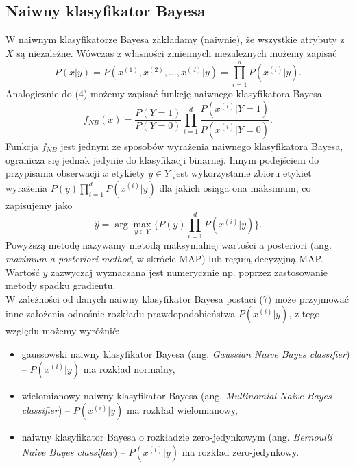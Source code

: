\documentclass[a4paper]{article}
\begin{document}
\subsection{Naiwny klasyfikator Bayesa}
W naiwnym klasyfikatorze Bayesa zakładamy (naiwnie), że wszystkie atrybuty z $X$ są niezależne. Wówczas z własności zmiennych niezależnych możemy zapisać
\begin{equation}
    P(x|y) = P(x^{(1)},x^{(2)},\dots, x^{(d)}|y) =  \prod\limits_{i=1}^d{P(x^{(i)}|y)}.
\end{equation}
Analogicznie do (4) możemy zapisać funkcję naiwnego klasyfikatora Bayesa 
\begin{equation}
    f_{NB}(x) = \frac{P(Y=1)}{P(Y=0)}\prod\limits_{i=1}^d\frac{P(x^{(i)}|Y=1)}{P(x^{(i)}|Y=0)}.
\end{equation}
Funkcja $f_{NB}$ jest jednym ze sposobów wyrażenia naiwnego klasyfikatora Bayesa, ogranicza się jednak jedynie do klasyfikacji binarnej. Innym podejściem do przypisania obserwacji $x$ etykiety $y\in Y$ jest wykorzystanie zbioru etykiet wyrażenia $P(y)\prod_{i=1}^d P(x^{(i)}|y)$ dla jakich osiąga ona maksimum, co zapisujemy jako
\begin{equation}\label{(2.35)}
    \hat{y} = \arg\max_{y\in Y} \lbrace P(y)\prod\limits_{i=1}^d P(x^{(i)}|y)\rbrace.
\end{equation}
Powyższą metodę nazywamy metodą maksymalnej wartości a posteriori (ang. \textit{maximum a posteriori method}, w skrócie MAP) lub regułą decyzyjną MAP. Wartość $\hat{y}$ zazwyczaj wyznaczana jest numerycznie np. poprzez zastosowanie metody spadku gradientu. \\\indent W zależności od danych naiwny klasyfikator Bayesa postaci (7) może przyjmować inne założenia odnośnie rozkładu prawdopodobieństwa $P(x^{(i)}|y)$, z tego względu możemy wyróżnić:
\begin{itemize}
    \item gaussowski naiwny klasyfikator Bayesa (ang. \textit{Gaussian Naive Bayes classifier}) -- $P(x^{(i)}|y)$ ma rozkład normalny,
    \item wielomianowy naiwny klasyfikator Bayesa (ang. \textit{Multinomial Naive Bayes classifier}) -- $P(x^{(i)}|y)$ ma rozkład wielomianowy, 
    \item naiwny klasyfikator Bayesa o rozkładzie zero-jedynkowym (ang. \textit{Bernoulli Naive Bayes classifier}) -- $P(x^{(i)}|y)$ ma rozkład zero-jedynkowy.
\end{itemize}
\end{document}
